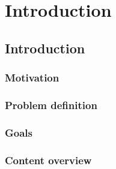 \chapter{Introduction}
\label{ch:intro}

\section{Introduction}
\subsection{Motivation}
\subsection{Problem definition}
\subsection{Goals}
\subsection{Content overview}

